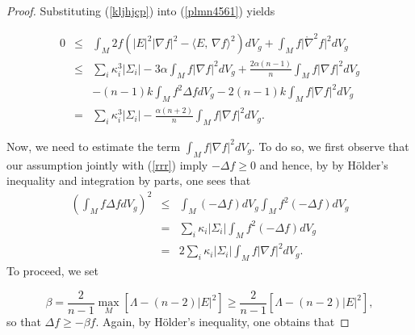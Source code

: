 \documentclass{amsart}
\numberwithin{equation}{section}
\begin{document}
\begin{proof}
		Substituting (\ref{kljhjçp}) into (\ref{plmn4561}) yields
		
		
	\begin{eqnarray}
	\label{4a}
	0&\leq &\int_{M}2f\left(|E|^2|\nabla f|^{2}-\langle E,\,\nabla f\rangle^{2} 	\right)dV_g+\int_{M}f\vert\mathring{\nabla}^2f\vert^{2}dV_g \nonumber\\
&\leq&\sum_{i}\kappa_{i}^3\vert\Sigma_{i}\vert    - 3\alpha\int_{M}f|\nabla f|^{2}dV_g  + \frac{2\alpha(n-1)}{n}\int_{M}f\vert\nabla f\vert^{2}dV_g \nonumber\\ 
			&&- (n-1)k\int_Mf^{2}\Delta f dV_g - 2(n-1)k\int_{M}f|\nabla f|^{2}dV_g\nonumber\\
			&=&\sum_{i}\kappa_{i}^3\vert\Sigma_{i}\vert     - \frac{\alpha(n+2)}{n}\int_{M}f\vert\nabla f\vert^{2}dV_g .
		\end{eqnarray} 
		
		Now, we need to estimate the term $\int_{M}f|\nabla f|^{2}dV_{g}.$ To do so, we first observe that our assumption jointly with (\ref{rrr}) imply  $- \Delta f\geq0$ and hence, by by H\"older’s inequality and integration by parts, one sees that
		\begin{eqnarray}\label{2}
	\left(\int_{M}f\Delta f dV_{g}\right)^{2} &\leq & \int_{M}(-\Delta f)dV_{g} \int_{M}f^{2}(-\Delta f)dV_{g}  \nonumber\\&=& \sum_{i}\kappa_{i}\vert\Sigma_{i}\vert \int_{M}f^{2}(-\Delta f)dV_{g} \nonumber\\
			&=& 2\sum_{i}\kappa_{i}\vert\Sigma_{i}\vert \int_{M}f|\nabla f|^{2}dV_{g}.
					\end{eqnarray} To proceed, we set 
					
						\[
	\beta = \dfrac{2}{n - 1}\max_{M}\left[ \Lambda - (n - 2)  |E|^2 \right] \geq	\dfrac{2}{n - 1} \left[ \Lambda - (n - 2) |E|^2 \right],
		\] so that $\Delta f \geq -\beta f.$ Again, by H\"older’s inequality, one obtains that
		

\end{proof}
\end{document}
